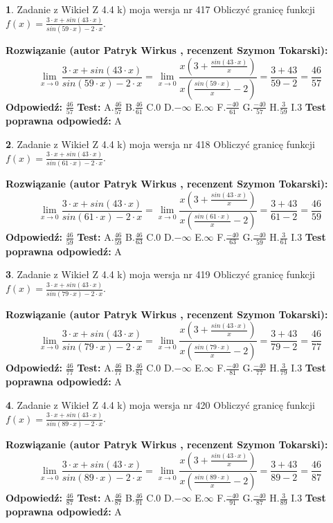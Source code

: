 \documentclass[12pt, a4paper]{article}
\theoremstyle{definition} %
\newtheorem{zad}{}
\newcommand{\zadStart}[1]{\begin{zad}#1\newline}
\newcommand{\zadStop}{\end{zad}}
\newcommand{\rozwStart}[2]{\noindent \textbf{Rozwiązanie (autor #1 , recenzent #2): }\newline}
\newcommand{\rozwStop}{\newline}
\newcommand{\odpStart}{\noindent \textbf{Odpowiedź:}\newline}
\newcommand{\odpStop}{\newline}
\newcommand{\testStart}{\noindent \textbf{Test:}\newline}
\newcommand{\testStop}{\newline}
\newcommand{\kluczStart}{\noindent \textbf{Test poprawna odpowiedź:}\newline}
\newcommand{\kluczStop}{\newline}
\begin{document}
\zadStart{Zadanie z Wikieł Z 4.4 k) moja wersja nr 417}
Obliczyć granicę funkcji $f(x)=\frac{3\cdot x +sin(43\cdot x)}{sin(59\cdot x) -2\cdot x}$.
\zadStop
\rozwStart{Patryk Wirkus}{Szymon Tokarski}
$$\lim\limits_{x\to 0}\frac{3\cdot x +sin(43\cdot x)}{sin(59\cdot x) -2\cdot x}
=\lim\limits_{x\to 0}\frac{x(3+\frac{sin(43\cdot x)}{x})}{x(\frac{sin(59\cdot x)}{x}-2)}
=\frac{3+43}{59-2} = \frac{46}{57}$$
\rozwStop
\odpStart
$\frac{46}{57}$
\odpStop
\testStart
A.$\frac{46}{57}$
B.$\frac{46}{61}$
C.$0$
D.$-\infty$
E.$\infty$
F.$\frac{-40}{61}$
G.$\frac{-40}{57}$
H.$\frac{3}{59}$
I.$3$
\testStop
\kluczStart
A
\kluczStop



\zadStart{Zadanie z Wikieł Z 4.4 k) moja wersja nr 418}
Obliczyć granicę funkcji $f(x)=\frac{3\cdot x +sin(43\cdot x)}{sin(61\cdot x) -2\cdot x}$.
\zadStop
\rozwStart{Patryk Wirkus}{Szymon Tokarski}
$$\lim\limits_{x\to 0}\frac{3\cdot x +sin(43\cdot x)}{sin(61\cdot x) -2\cdot x}
=\lim\limits_{x\to 0}\frac{x(3+\frac{sin(43\cdot x)}{x})}{x(\frac{sin(61\cdot x)}{x}-2)}
=\frac{3+43}{61-2} = \frac{46}{59}$$
\rozwStop
\odpStart
$\frac{46}{59}$
\odpStop
\testStart
A.$\frac{46}{59}$
B.$\frac{46}{63}$
C.$0$
D.$-\infty$
E.$\infty$
F.$\frac{-40}{63}$
G.$\frac{-40}{59}$
H.$\frac{3}{61}$
I.$3$
\testStop
\kluczStart
A
\kluczStop



\zadStart{Zadanie z Wikieł Z 4.4 k) moja wersja nr 419}
Obliczyć granicę funkcji $f(x)=\frac{3\cdot x +sin(43\cdot x)}{sin(79\cdot x) -2\cdot x}$.
\zadStop
\rozwStart{Patryk Wirkus}{Szymon Tokarski}
$$\lim\limits_{x\to 0}\frac{3\cdot x +sin(43\cdot x)}{sin(79\cdot x) -2\cdot x}
=\lim\limits_{x\to 0}\frac{x(3+\frac{sin(43\cdot x)}{x})}{x(\frac{sin(79\cdot x)}{x}-2)}
=\frac{3+43}{79-2} = \frac{46}{77}$$
\rozwStop
\odpStart
$\frac{46}{77}$
\odpStop
\testStart
A.$\frac{46}{77}$
B.$\frac{46}{81}$
C.$0$
D.$-\infty$
E.$\infty$
F.$\frac{-40}{81}$
G.$\frac{-40}{77}$
H.$\frac{3}{79}$
I.$3$
\testStop
\kluczStart
A
\kluczStop



\zadStart{Zadanie z Wikieł Z 4.4 k) moja wersja nr 420}
Obliczyć granicę funkcji $f(x)=\frac{3\cdot x +sin(43\cdot x)}{sin(89\cdot x) -2\cdot x}$.
\zadStop
\rozwStart{Patryk Wirkus}{Szymon Tokarski}
$$\lim\limits_{x\to 0}\frac{3\cdot x +sin(43\cdot x)}{sin(89\cdot x) -2\cdot x}
=\lim\limits_{x\to 0}\frac{x(3+\frac{sin(43\cdot x)}{x})}{x(\frac{sin(89\cdot x)}{x}-2)}
=\frac{3+43}{89-2} = \frac{46}{87}$$
\rozwStop
\odpStart
$\frac{46}{87}$
\odpStop
\testStart
A.$\frac{46}{87}$
B.$\frac{46}{91}$
C.$0$
D.$-\infty$
E.$\infty$
F.$\frac{-40}{91}$
G.$\frac{-40}{87}$
H.$\frac{3}{89}$
I.$3$
\testStop
\kluczStart
A
\kluczStop
\end{document}
